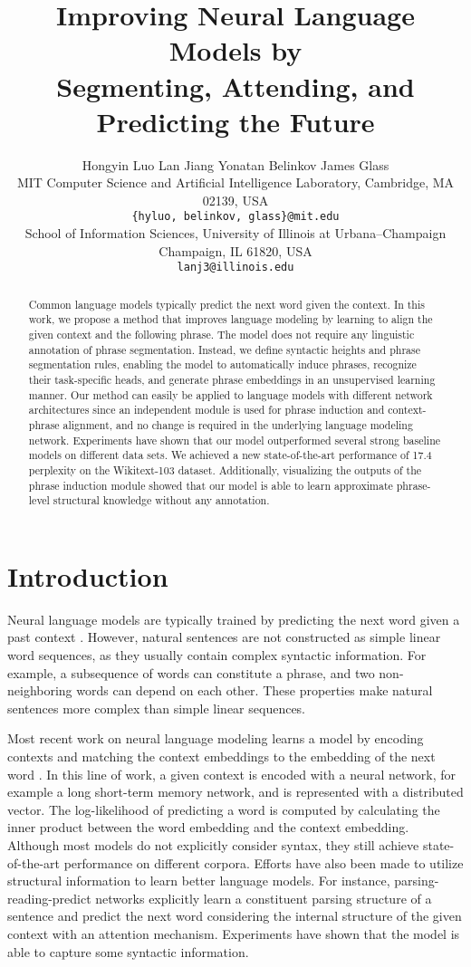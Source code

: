\documentclass[11pt,a4paper]{article}
\title{Improving Neural Language Models by\\ Segmenting, Attending, and Predicting the Future}
\author{Hongyin Luo  Lan Jiang  Yonatan Belinkov  James Glass \\
  MIT Computer Science and Artificial Intelligence Laboratory, Cambridge, MA 02139, USA \\
  {\tt \{hyluo, belinkov, glass\}@mit.edu}\\
  School of Information Sciences, University of Illinois at Urbana--Champaign\\ Champaign, IL
61820, USA \\ 
  {\tt lanj3@illinois.edu}
  }
\date{}
\begin{document}
\maketitle
\begin{abstract}
Common language models typically predict the next word given the context. In this work, we propose a method that improves language modeling by learning to align the given context and the following phrase. The model does not require any linguistic annotation of phrase segmentation. Instead, we define syntactic heights and phrase segmentation rules, enabling the model to automatically induce phrases, recognize their task-specific heads, and generate phrase embeddings in an unsupervised learning manner. Our method can easily be applied to language models with different network architectures since an independent module is used for phrase induction and context-phrase alignment, and no change is required in the underlying language modeling network. Experiments have shown that our model outperformed several strong baseline models on different data sets. We achieved a new state-of-the-art performance of 17.4 perplexity on the Wikitext-103 dataset. Additionally, visualizing the outputs of the phrase induction module showed that our model is able to learn approximate phrase-level structural knowledge without any annotation.
\end{abstract}

\section{Introduction}

Neural language models
are typically trained
by predicting the next word given a past context \cite{bengio2003neural}. However, natural sentences are not constructed as simple linear word sequences, as they usually contain complex syntactic information. For example, a subsequence of words can constitute a phrase, and two non-neighboring words can depend on each other. These properties make natural sentences more complex than simple linear sequences.

Most recent work on neural language modeling learns a model by encoding contexts and matching the context embeddings to the embedding of the next word \cite{bengio2003neural,merity2017regularizing,melis2017state}. In this line of work, a given context is encoded with a neural network, for example a long short-term memory \citep[LSTM;][]{hochreiter1997long} network, and is represented with a distributed vector. The log-likelihood of predicting a word is computed by calculating the inner product between the word embedding and the context embedding. Although most models do not explicitly consider syntax, they still achieve state-of-the-art performance on different corpora. Efforts have also been made to utilize structural information to learn better language models. For instance, parsing-reading-predict networks \citep[PRPN;][]{shen2017neural} explicitly learn a constituent parsing structure of a sentence and predict the next word considering the internal structure of the given context with an attention mechanism. Experiments have shown that the model is able to capture some syntactic information.
\end{document}
